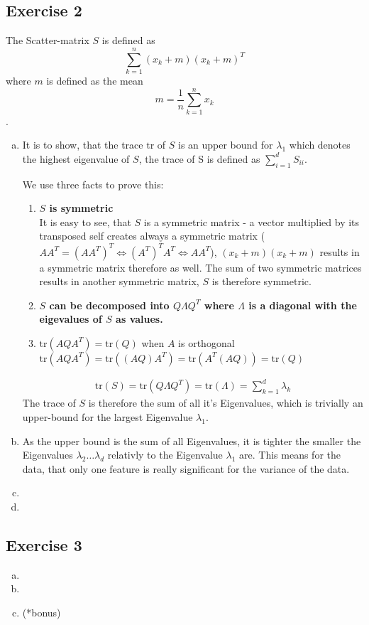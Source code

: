 \documentclass[10pt,a4paper]{article}
\newcommand{\tr}{\text{tr}}
\begin{document}
\subsection*{Exercise 2}
The Scatter-matrix $S$ is defined as $$\sum_{k = 1}^{n} (x_k + m)(x_k + m)^T$$ where $m$ is defined as the mean $$m = \frac{1}{n}\sum_{k=1}^{n}x_k$$. 
\begin{enumerate}[(a)]
\item
It is to show, that the trace $\tr$ of $S$ is an upper bound for $\lambda_1$ which denotes the highest eigenvalue of $S$, the trace of S is defined as $\sum^d_{i=1} S_{ii}$.

We use three facts to prove this:
\begin{enumerate}[1.]
    \item \textbf{$S$ is symmetric} \\
    It is easy to see, that $S$ is a symmetric matrix - a vector multiplied by its transposed self creates always a symmetric matrix ($AA^T = (AA^T)^T \Leftrightarrow (A^T)^TA^T \Leftrightarrow AA^T$), $(x_k + m)(x_k + m)$ results in a symmetric matrix therefore as well. The sum of two symmetric matrices results in another symmetric matrix, $S$ is therefore symmetric.
    \item \textbf{$S$ can be decomposed into $Q\Lambda Q^T$ where $\Lambda$ is a diagonal with the eigevalues of $S$ as values.} %
    \item $\tr(AQA^T) = \tr(Q)$ when $A$ is orthogonal \\
    $\tr(AQA^T) = \tr((AQ)A^T) = \tr(A^T(AQ)) = \tr(Q)$
\end{enumerate}

\begin{align*}
\tr(S) = \tr(Q\Lambda Q^T) = \tr(\Lambda) = \sum_{k = 1}^{d} \lambda_k
\end{align*}
The trace of $S$ is therefore the sum of all it's Eigenvalues, which is trivially an upper-bound for the largest Eigenvalue $\lambda_1$. 
\item As the upper bound is the sum of all Eigenvalues, it is tighter the smaller the Eigenvalues $\lambda_2 \dots \lambda_d$ relativly to the Eigenvalue $\lambda_1$ are. This means for the data, that only one feature is really significant for the variance of the data.
\item 
\item
\end{enumerate}
\subsection*{Exercise 3}
\begin{enumerate}[(a)]
\item
\item
\item (*bonus)
\end{enumerate}
\end{document}
